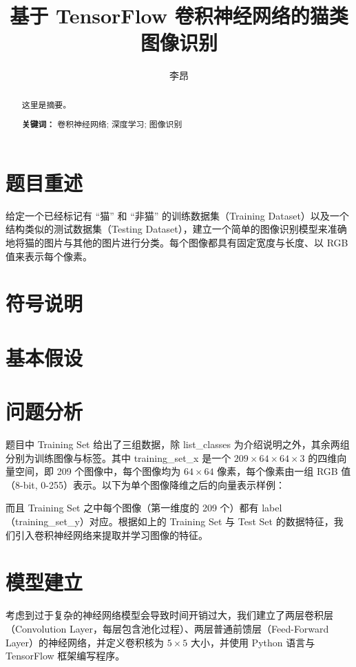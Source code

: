 \documentclass[UTF8]{ctexart}
\author{李昂}
\title{基于 TensorFlow 卷积神经网络的猫类图像识别}
\begin{document}
\maketitle
\begin{abstract}
这里是摘要。
\begin{flushleft}
\textbf{关键词：} 卷积神经网络; 深度学习; 图像识别
\end{flushleft}
\end{abstract}

\clearpage

\section{题目重述}
给定一个已经标记有 “猫” 和 “非猫” 的训练数据集（Training Dataset）以及一个结构类似的测试数据集（Testing Dataset），建立一个简单的图像识别模型来准确地将猫的图片与其他的图片进行分类。每个图像都具有固定宽度与长度、以 RGB 值来表示每个像素。

\section{符号说明}

\section{基本假设}

\section{问题分析}
题目中 Training Set 给出了三组数据，除 list\_classes 为介绍说明之外，其余两组分别为训练图像与标签。其中 training\_set\_x 是一个 $209 \times 64 \times 64 \times 3$ 的四维向量空间，即 209 个图像中，每个图像均为 $64 \times 64$ 像素，每个像素由一组 RGB 值（8-bit, 0-255）表示。以下为单个图像降维之后的向量表示样例：

而且 Training Set 之中每个图像（第一维度的 209 个）都有 label（training\_set\_y）对应。根据如上的 Training Set 与 Test Set 的数据特征，我们引入卷积神经网络来提取并学习图像的特征。

\section{模型建立}
考虑到过于复杂的神经网络模型会导致时间开销过大，我们建立了两层卷积层（Convolution Layer，每层包含池化过程）、两层普通前馈层（Feed-Forward Layer）的神经网络，并定义卷积核为 $5 \times 5$ 大小，并使用 Python 语言与 TensorFlow 框架编写程序。
\end{document}
